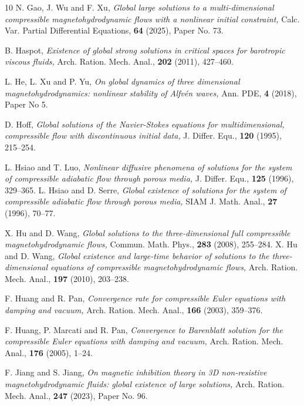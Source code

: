 \documentclass[12pt, reqno]{amsart}
\numberwithin{equation}{section}
\numberwithin{equation}{section}
\numberwithin{equation}{section}
\numberwithin{equation}{section}
\theoremstyle{remark}
\begin{document}
\begin{thebibliography}{10}
N. Gao, J. Wu and F. Xu,  {\it Global large solutions to a multi-dimensional compressible magnetohydrodynamic flows with a nonlinear initial constraint,} Calc. Var. Partial Differential Equations, \textbf{64} (2025),  Paper No. 73.



 B. Haspot, {\it Existence of global strong solutions in critical spaces for barotropic viscous fluids,}  Arch. Ration. Mech. Anal., \textbf{202} (2011), 427--460.


 L. He, L. Xu and  P. Yu, {\it On global dynamics of three dimensional magnetohydrodynamics: nonlinear stability of Alfv\'{e}n waves,} Ann. PDE,  \textbf{4} (2018), Paper No 5.

D. Hoff, {\it Global solutions of the Navier-Stokes equations for multidimensional, compressible flow with discontinuous initial data,} J. Differ. Equ., \textbf{120} (1995), 215--254.


 L. Hsiao and  T. Luo, {\it Nonlinear diffusive phenomena of solutions for the system of compressible adiabatic
flow through porous media,} J. Differ. Equ., \textbf{125} (1996), 329--365.
 L. Hsiao and  D. Serre, {\it Global existence of solutions for the system of compressible adiabatic flow
through porous media,} SIAM J. Math. Anal., \textbf{27} (1996), 70--77.




    X. Hu and D. Wang, {\it  Global solutions to the three-dimensional full compressible magnetohydrodynamic flows,} Commun. Math. Phys.,  {\bf 283} (2008), 255--284.
  X. Hu and D. Wang, {\it  Global existence and large-time behavior of solutions to the three-dimensional equations of compressible magnetohydrodynamic flows,} Arch. Ration. Mech. Anal.,  {\bf197} (2010), 203--238.

 F. Huang and  R. Pan, {\it Convergence rate for compressible Euler equations with damping and vacuum,}
Arch. Ration. Mech. Anal., \textbf{166} (2003), 359--376.

 F. Huang, P. Marcati and  R. Pan, {\it Convergence to Barenblatt solution for the compressible Euler
equations with damping and vacuum,} Arch. Ration. Mech. Anal., \textbf{176} (2005), 1--24.

 F. Jiang and S. Jiang,  {\it On magnetic inhibition theory in 3D non-resistive magnetohydrodynamic fluids: global existence of large solutions,} Arch. Ration. Mech. Anal., {\bf 247} (2023),  Paper No. 96.


\end{thebibliography}
\end{document}
